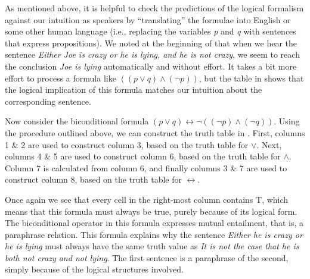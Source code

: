 As mentioned above, it is helpful to check the predictions of the logical formalism against our intuition as speakers by “translating” the formulae into English or some other human language (i.e., replacing the variables \textit{p} and \textit{q} with sentences that express propositions). We noted at the beginning of  that when we hear the sentence \textit{Either Joe is crazy or he is lying, and he is not crazy}, we seem to reach the conclusion \textit{Joe is lying} automatically and without effort. It takes a bit more effort to process a formula like $((p\vee q) \wedge (\neg p))$, but the table in  shows that the logical implication of this formula matches our intuition about the corresponding sentence.

Now consider the biconditional formula $(p\vee q) \leftrightarrow \neg((\neg p) \wedge (\neg q))$. Using the procedure outlined above, we can construct the truth table in . First, columns 1 \& 2 are used to construct column 3, based on the truth table for \textit{$\vee$}. Next, columns 4 \& 5 are used to construct column 6, based on the truth table for \textit{$\wedge$}. Column 7 is calculated from column 6, and finally columns 3 \& 7 are used to construct column 8, based on the truth table for $\leftrightarrow$.



Once again we see that every cell in the right-most column contains T, which means that this formula must always be true, purely because of its logical form. The biconditional operator in this formula expresses mutual entailment, that is, a paraphrase relation. This formula explains why the sentence \textit{Either he is crazy or he is lying} must always have the same truth value as \textit{It is not the case that he is both not crazy and not lying}. The first sentence is a paraphrase of the second, simply because of the logical structures involved.



